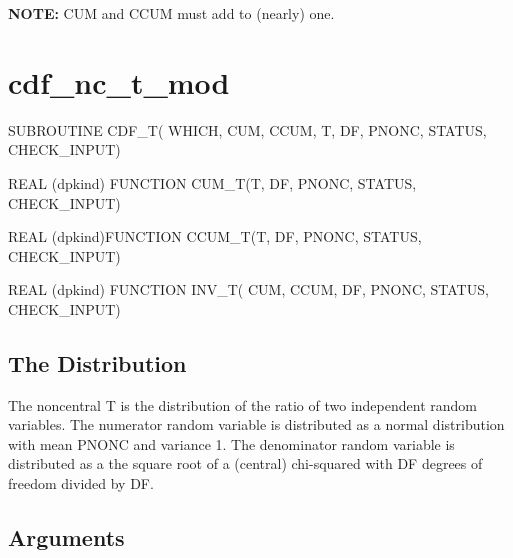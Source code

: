 \documentclass[12pt,dvips]{article}
\newcommand{\mysection}[1]{\color{blue}
             \section{#1} \normalcolor}
\newcommand{\mysubsection}[1] {\color{green}
             \subsection{#1} \normalcolor}
\begin{document}
{\bf NOTE:} CUM and CCUM  must add to (nearly) one.

\pagebreak

\mysection{cdf\_nc\_t\_mod}

\begin{description}

\item SUBROUTINE CDF\_T( WHICH, CUM, CCUM, T, DF, PNONC,
STATUS, CHECK\_INPUT)

\item    REAL   (dpkind)   FUNCTION    CUM\_T(T,
DF, PNONC, STATUS, CHECK\_INPUT)

\item    REAL    (dpkind)FUNCTION    CCUM\_T(T,
DF, PNONC, STATUS, CHECK\_INPUT)

\item  REAL (dpkind) FUNCTION  INV\_T(  CUM, CCUM,
DF, PNONC, STATUS, CHECK\_INPUT)

\end{description}

\mysubsection{The Distribution}

The noncentral T  is the distribution of the  ratio of two independent
random variables.   The numerator random variable is  distributed as a
normal distribution  with mean PNONC and variance  1.  The denominator
random variable  is distributed  as a the  square root of  a (central)
chi-squared with DF degrees of freedom divided by DF.

\mysubsection{Arguments}
\end{document}
